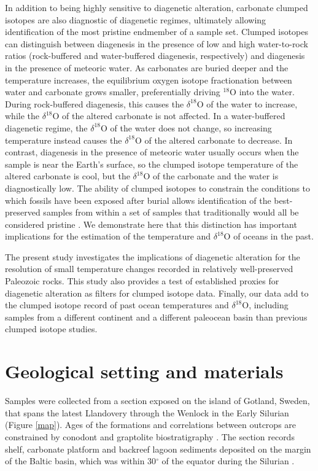 \documentclass[5p, authoryear]{elsarticle}
\newcommand{\deltao}{$\delta^{18}$}
\begin{document}
In addition to being highly sensitive to diagenetic alteration, carbonate clumped isotopes are also diagnostic of diagenetic regimes, ultimately allowing identification of the most pristine endmember of a sample set. Clumped isotopes can distinguish between diagenesis in the presence of low and high water-to-rock ratios (rock-buffered and water-buffered diagenesis, respectively) and diagenesis in the presence of meteoric water. As carbonates are buried deeper and the temperature increases, the equilibrium oxygen isotope fractionation between water and carbonate grows smaller, preferentially driving $^{18}$O into the water. During rock-buffered diagenesis, this causes the \deltao O of the water to increase, while the \deltao O of the altered carbonate is not affected. In a water-buffered diagenetic regime, the \deltao O of the water does not change, so increasing temperature instead causes the \deltao O of the altered carbonate to decrease. In contrast, diagenesis in the presence of meteoric water usually occurs when the sample is near the Earth's surface, so the clumped isotope temperature of the altered carbonate is cool, but the \deltao O of the carbonate and the water is diagnostically low. The ability of clumped isotopes to constrain the conditions to which fossils have been exposed after burial allows identification of the best-preserved samples from within a set of samples that traditionally would all be considered pristine \citep{Eiler2011}. We demonstrate here that this distinction has important implications for the estimation of the temperature and \deltao O of oceans in the past.  

The present study investigates the implications of diagenetic alteration for the resolution of small temperature changes recorded in relatively well-preserved Paleozoic rocks. This study also provides a test of established proxies for diagenetic alteration as filters for clumped isotope data. Finally, our data add to the clumped isotope record of past ocean temperatures and \deltao O, including samples from a different continent and a different paleocean basin than previous clumped isotope studies. 

\section{Geological setting and materials}

Samples were collected from a section exposed on the island of Gotland, Sweden, that spans the latest Llandovery through the Wenlock in the Early Silurian (Figure \ref{map}). Ages of the formations and correlations between outcrops are constrained by conodont and graptolite biostratigraphy \citep{Jeppsson2006}. The section records shelf, carbonate platform and backreef lagoon sediments deposited on the margin of the Baltic basin, which was within 30$^{\circ}$ of the equator during the Silurian \citep{Torsvik1992}. 
\end{document}
